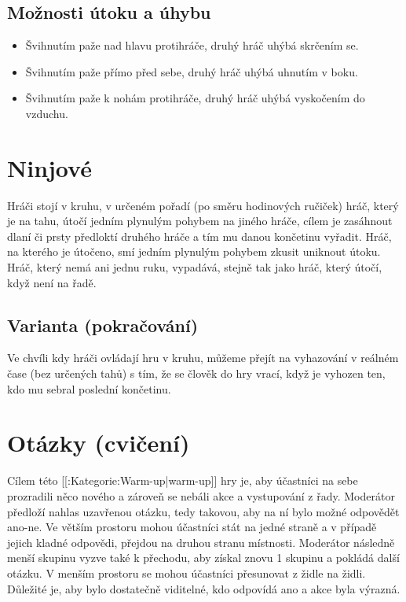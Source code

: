 \documentclass[main.tex]{subfiles}
\begin{document}
\subsection{ Možnosti útoku a úhybu } \begin{itemize}
\item  Švihnutím paže nad hlavu protihráče, druhý hráč uhýbá skrčením se.
\item  Švihnutím paže přímo před sebe, druhý hráč uhýbá uhnutím v boku.
\item  Švihnutím paže k nohám protihráče, druhý hráč uhýbá vyskočením do vzduchu.
\end{itemize}
 
 
 
\needspace{5cm} \section{Ninjové} \label{ninjové} Hráči stojí v kruhu, v určeném pořadí (po směru hodinových ručiček) hráč, který je na tahu, útočí jedním plynulým pohybem na jiného hráče, cílem je zasáhnout dlaní či prsty předloktí druhého hráče a tím mu danou končetinu vyřadit. Hráč, na kterého je útočeno, smí jedním plynulým pohybem zkusit uniknout útoku. 
Hráč, který nemá ani jednu ruku, vypadává, stejně tak jako hráč, který útočí, když není na řadě. 
 
\subsection{Varianta (pokračování) } Ve chvíli kdy hráči ovládají hru v kruhu, můžeme přejít na vyhazování v reálném čase (bez určených tahů) s tím, že se člověk do hry vrací, když je vyhozen ten, kdo mu sebral poslední končetinu.  
 
 
\needspace{5cm} \section{Otázky (cvičení)} \label{otázky (cvičení)} Cílem této [[:Kategorie:Warm-up|warm-up]] hry je, aby účastníci na sebe prozradili něco nového a zároveň se nebáli akce a vystupování z řady. Moderátor předloží nahlas uzavřenou otázku, tedy takovou, aby na ní bylo možné odpovědět ano-ne. Ve větším prostoru mohou účastníci stát na jedné straně a v případě jejich kladné odpovědi, přejdou na druhou stranu místnosti. Moderátor následně menší skupinu vyzve také k přechodu, aby získal znovu 1 skupinu a pokládá další otázku. V menším prostoru se mohou účastníci přesunovat z židle na židli. Důležité je, aby bylo dostatečně viditelné, kdo odpovídá ano a akce byla výrazná. 
 
\end{document}
